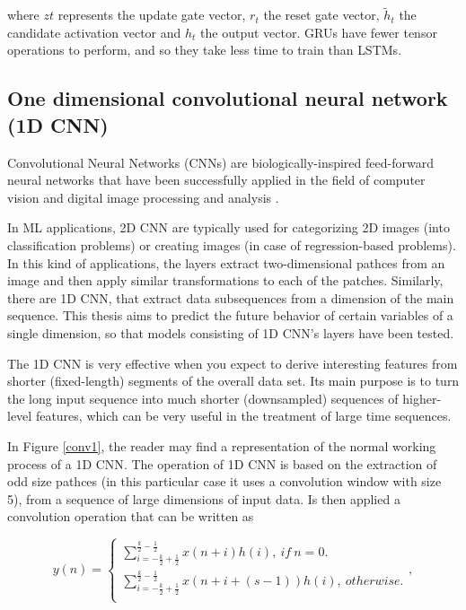 where $zt$ represents the update gate vector, $r_t$ the reset gate vector, $\tilde{h}_t$ the candidate activation vector and $h_t$ the output vector. \ac{GRU}s have fewer tensor operations to perform, and so they take less time to train than \ac{LSTM}s.  



\subsection{One dimensional convolutional neural network (1D CNN)}


Convolutional Neural Networks (\ac{CNN}s) are biologically-inspired feed-forward neural networks that have been successfully applied in the field of computer vision and digital image processing and analysis \cite{cnn0}.

In \ac{ML} applications, \ac{2D CNN} are typically used for categorizing 2D images (into classification problems) or creating images (in case of regression-based problems). In this kind of applications, the layers extract two-dimensional pathces from an image and then apply similar transformations to each of the patches. Similarly, there are \ac{1D CNN}, that extract data subsequences from a dimension of the main sequence. This thesis aims to predict the future behavior of certain variables of a single dimension, so that models consisting of \ac{1D CNN}'s layers have been tested.

The \ac{1D CNN} is very effective when you expect to derive interesting features from shorter (fixed-length) segments of the overall data set. Its main purpose is to turn the long input sequence into much shorter (downsampled) sequences of higher-level features, which can be very useful in the treatment of large time sequences.

In Figure \ref{conv1}, the reader may find a representation of the normal working process of a \ac{1D CNN}. The operation of \ac{1D CNN} is based on the extraction of odd size pathces (in this particular case it uses a convolution window with size 5), from a sequence of large dimensions of input data. Is then applied a convolution operation that can be written as \cite{cnn2} 

\begin{equation}
y(n)=
    \begin{cases} 
            
        \sum_{i=-\frac{k}{2}+\frac{1}{2}}^{\frac{k}{2}-\frac{1}{2}} x(n+i)h(i),\  if \  n=0.\\
        \sum_{i=-\frac{k}{2}+\frac{1}{2}}^{\frac{k}{2}-\frac{1}{2}} x(n+i+(s-1))h(i),\  otherwise.\\
    
    \end{cases} ,
\end{equation}

